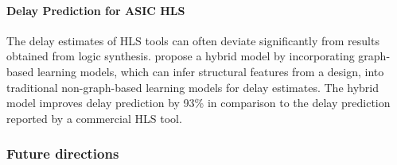 \paragraph{Delay Prediction for ASIC HLS}%
The delay estimates of HLS tools can often deviate significantly from results obtained from logic synthesis. %
\citet{De2023hls} propose %
a hybrid model by incorporating graph-based learning models, which can infer structural features from a design, into traditional non-graph-based learning models for delay estimates. The hybrid model improves delay prediction by 93\% in comparison to the delay prediction reported %
by a %
commercial HLS tool. 

\subsubsection*{\bf{Future directions}}

